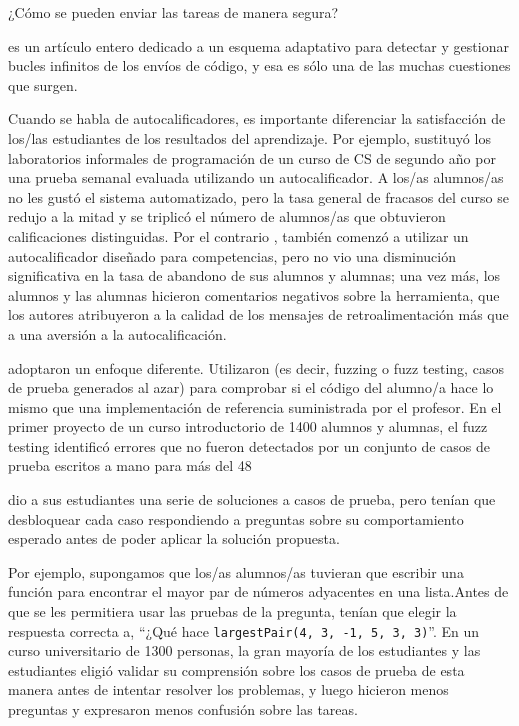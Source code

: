 ¿Cómo se pueden enviar las tareas de manera segura?

\cite{Edwa2014a} es un artículo entero dedicado a un esquema adaptativo para detectar y gestionar bucles infinitos de los envíos de código, y esa es sólo una de las muchas cuestiones que surgen.

Cuando se habla de autocalificadores, 
es importante diferenciar la satisfacción de los/las estudiantes de los resultados del aprendizaje.
Por ejemplo, 
\cite{Magu2018} sustituyó los laboratorios informales de programación de un curso de CS de segundo año por una prueba semanal evaluada utilizando un autocalificador.
A los/as alumnos/as no les gustó el sistema automatizado, 
pero la tasa general de fracasos del curso se redujo a la mitad 
y se triplicó el número de alumnos/as que obtuvieron calificaciones distinguidas.
Por el contrario , 
\cite{Rubi2014} también comenzó a utilizar un autocalificador diseñado para competencias, pero no vio una disminución significativa en la tasa de abandono de sus alumnos y alumnas;
una vez más, 
los alumnos y las alumnas hicieron comentarios negativos sobre la herramienta, 
que los autores atribuyeron a la calidad de los mensajes de retroalimentación más que a una aversión a la autocalificación.

\cite{Srid2016} adoptaron un enfoque diferente.
Utilizaron  
(es decir, fuzzing o fuzz testing, casos de prueba generados al azar) 
para comprobar si el código del alumno/a hace lo mismo que una implementación de referencia suministrada por el profesor.
En el primer proyecto de un curso introductorio de 1400 alumnos y alumnas, el fuzz testing identificó errores que no fueron detectados por un conjunto de casos de prueba escritos a mano para más del 48 %

\cite{Basu2015}  dio a sus estudiantes una serie de soluciones a casos de prueba, 
pero tenían que desbloquear cada caso respondiendo a preguntas sobre su comportamiento esperado
antes de poder aplicar la solución propuesta.

Por ejemplo, 
supongamos que los/as alumnos/as tuvieran que escribir una función para encontrar el mayor par de números adyacentes en una lista.Antes de que se les permitiera usar las pruebas de la pregunta, tenían que elegir la respuesta correcta a, ``¿Qué hace  \texttt{largestPair(4, 3, -1, 5, 3, 3)}''.
En un curso universitario de 1300 personas, 
la gran mayoría de los estudiantes y las estudiantes eligió validar su comprensión sobre los casos de prueba de esta manera 
antes de intentar resolver los problemas, 
y luego hicieron menos preguntas y expresaron menos confusión sobre las tareas.

